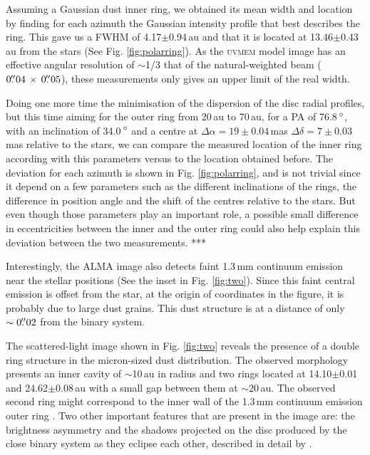 \documentclass[letters,usenatbib,times]{mnras}
\begin{document}
Assuming a Gaussian dust inner ring, we obtained its mean width and location by finding for each azimuth the Gaussian intensity profile that best describes the ring. This gave us a FWHM of 4.17$\pm$0.94\,au and that it is located at 13.46$\pm$0.43\,au from the stars (See Fig. \ref{fig:polarring}). As the \textsc{uvmem} model image has an effective angular resolution of $\sim$1/3 that of the natural-weighted beam ($0\hbox{$.\!\!^{\prime\prime}$}04 \,\times \, 0\hbox{$.\!\!^{\prime\prime}$}05$), these measurements only gives an upper limit of the real width.

Doing one more time the minimisation of the dispersion of the disc radial profiles, but this time aiming for the outer ring from 20\,au to 70\,au, for a PA of 76.8\,$\hbox{$^\circ$}$, with an inclination of 34.0\,$\hbox{$^\circ$}$ and a centre at $\Delta \alpha = 19\pm0.04$\,mas $\Delta \delta = 7\pm0.03$\,mas relative to the stars, we can compare the measured location of the inner ring according with this parameters versus to the location obtained before. The deviation for each azimuth is shown in Fig. \ref{fig:polarring}, and is not trivial since it depend on a few parameters such as the different inclinations of the rings, the difference in position angle and the shift of the centres relative to the stars. But even though those parameters play an important role, a possible small difference in eccentricities between the inner and the outer ring could also help explain this deviation between the two measurements. ***

Interestingly, the ALMA image also detects faint 1.3\,mm continuum emission near the stellar positions (See the inset in Fig. \ref{fig:two}). Since this faint central emission is offset from the star, at the origin of coordinates in the figure, it is probably due to large dust grains. This dust structure is at a distance of only $\sim0\hbox{$.\!\!^{\prime\prime}$}02$ from the binary system.

The scattered-light image shown in Fig. \ref{fig:two} reveals the presence of a double ring structure in the micron-sized dust distribution. The observed morphology presents an inner cavity of $\sim$10\,au in radius and two rings located at 14.10$\pm$0.01 and 24.62$\pm$0.08\,au with a small gap between them at $\sim$20\,au. The observed second ring might correspond to the inner wall of the 1.3\,mm continuum emission outer ring \citep{Ru_z_Rodr_guez_2019}. Two other important features that are present in the image are: the brightness asymmetry and the shadows projected on the disc produced by the close binary system as they eclipse each other, described in detail by \citet{dOrazi}.
\end{document}
